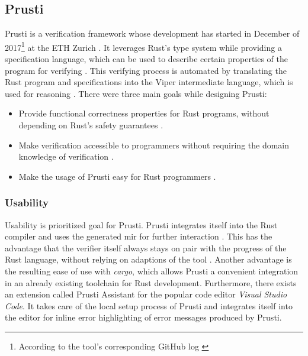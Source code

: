 \subsection{Prusti}
\label{cap:prusti}

Prusti is a verification framework whose development has started in December of 2017\footnote{According to the tool's corresponding GitHub log \cite{eth_zurich_initial_2017}} at the ETH Zurich \cite{astrauskas_leveraging_2019,deshmukh_prusti_2022}. It leverages Rust's type system while providing a specification language, which can be used to describe certain properties of the program for verifying \cite{astrauskas_leveraging_2019}. This verifying process is automated by translating the Rust program and specifications into the Viper \cite{jobstmann_viper_2016} intermediate language, which is used for reasoning \cite{astrauskas_leveraging_2019}. There were three main goals while designing Prusti:

\begin{itemize}
    \item Provide functional correctness properties for Rust programs, without depending on Rust's safety guarantees \cite{deshmukh_prusti_2022}.
    \item Make verification accessible to programmers without requiring the domain knowledge of verification \cite{deshmukh_prusti_2022}.
    \item Make the usage of Prusti easy for Rust programmers \cite{deshmukh_prusti_2022}.
\end{itemize}

\subsubsection{Usability}
\label{cap:prusti_usability}

Usability is prioritized goal for Prusti.
Prusti integrates itself into the Rust compiler and uses the generated \acs{mir} for further interaction \cite{deshmukh_prusti_2022}. This has the advantage that the verifier itself always stays on pair with the progress of the Rust language, without relying on adaptions of the tool \cite{deshmukh_prusti_2022}. Another advantage is the resulting ease of use with \textit{cargo}, which allows Prusti a convenient integration in an already existing toolchain for Rust development. Furthermore, there exists an extension called Prusti Assistant \cite{chair_of_programming_methodology_-_eth_zurich_prusti_nodate} for the popular code editor \textit{Visual Studio Code}. It takes care of the local setup process of Prusti and integrates itself into the editor for inline error highlighting of error messages produced by Prusti.

